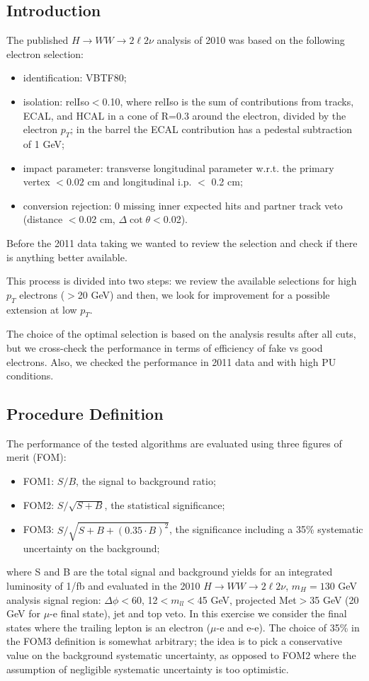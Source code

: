 \subsection{Introduction}
The published $H\rightarrow WW\rightarrow 2\ell 2\nu$ analysis of 2010 was based on the following electron selection:
\begin{itemize}
\item identification: VBTF80;
\item isolation: relIso$<$0.10, where relIso is the sum of contributions from tracks, ECAL, and HCAL in a cone of R=0.3 around the electron, 
divided by the electron $p_T$; in the barrel the ECAL contribution has a pedestal subtraction of 1 GeV;
\item impact parameter: transverse longitudinal parameter w.r.t. the primary vertex $<0.02$ cm and longitudinal i.p. $<$ 0.2 cm;
\item conversion rejection: 0 missing inner expected hits and partner track veto (distance $<$0.02 cm, $\Delta \cot \theta <$0.02).
\end{itemize}
Before the 2011 data taking we wanted to review the selection and check if there is anything better available.

This process is divided into two steps: we review the available selections for high $p_T$ electrons ($>$20 GeV) and then, 
we look for improvement for a possible extension at low $p_T$.

The choice of the optimal selection is based on the analysis results after all cuts, 
but we cross-check the performance in terms of efficiency of fake vs good electrons.
Also, we checked the performance in 2011 data and with high PU conditions.

\subsection{Procedure Definition}
The performance of the tested algorithms are evaluated using three figures of merit (FOM):
\begin{itemize}
\item FOM1: $S/B$, the signal to background ratio;
\item FOM2: $S/\sqrt{S+B}$, the statistical significance;
\item FOM3: $S/\sqrt{S+B+(0.35 \cdot B)^2}$, the significance including a 35\% systematic uncertainty on the background;
\end{itemize}
where S and B are the total signal and background yields for an integrated luminosity of 1/fb and evaluated in the 2010 
$H\rightarrow WW\rightarrow 2\ell 2\nu$, $m_H=130$ GeV analysis signal region:
$\Delta\phi < 60$, 12$< m_{ll} <$45 GeV, projected Met$>$35 GeV (20 GeV for $\mu$-e final state), jet and top veto.
In this exercise we consider the final states where the trailing lepton is an electron ($\mu$-e and e-e).
The choice of 35\% in the FOM3 definition is somewhat arbitrary; the idea is to pick a conservative value on the background systematic uncertainty, 
as opposed to FOM2 where the assumption of negligible systematic uncertainty is too optimistic.

